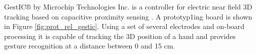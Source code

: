 GestIC® by Microchip Technologies Inc. is a controller for electric near field 3D tracking based on capacitive proximity sensing \cite{microchip2013}. A prototyp1ing board is shown in Figure \ref{fig:prot_rel_gestic}. Using a set of several electrodes and on-board processing it is capable of tracking the 3D position of a hand and provides gesture recognition at a distance between 0 and 15 cm. 
